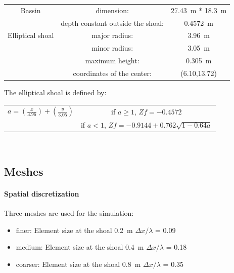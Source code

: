 \begin{tabular}{ccc}
Bassin & dimension:& 27.43~m * 18.3~m\\
 &depth constant outside the shoal:& 0.4572~m\\
\hline
Elliptical shoal & major radius:& 3.96~m\\
 & minor radius:& 3.05~m\\
  & maximum height:& 0.305~m\\
  & coordinates of the center:& (6.10,13.72)
\end{tabular}

\vspace{1cm}

The elliptical shoal is defined by:
\begin{center}

\begin{tabular}{c|c}
$a = (\frac{x}{3.96})+(\frac{y}{3.05})$ & if $a \geq 1$, $Zf = -0.4572$\\
 & if $a < 1$, $Zf = -0.9144+0.762 \sqrt{1-0.64a}$
\end{tabular}\\
\end{center}
\subsection{Meshes}
\paragraph{Spatial discretization}
Three meshes are used for the simulation:
\begin{itemize}
\item finer: Element size at the shoal 0.2~m \quad $\Delta x/\lambda$ = 0.09
\item medium: Element size at the shoal 0.4~m \quad $\Delta x/\lambda$ = 0.18
\item coarser: Element size at the shoal 0.8~m \quad $\Delta x/\lambda$ = 0.35
\end{itemize}

